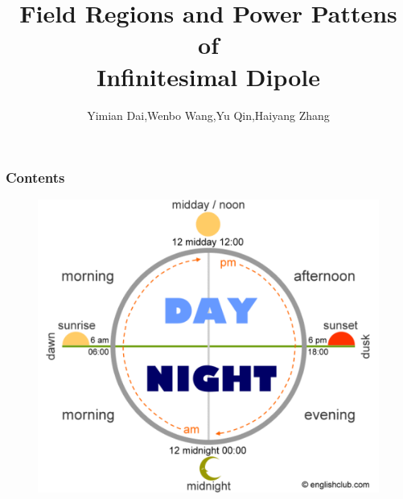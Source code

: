 \documentclass[compress=true]{beamer}
\title{Field Regions and Power Pattens of \\ Infinitesimal Dipole}
\author{\tiny{Yimian Dai,Wenbo Wang,Yu Qin,Haiyang Zhang}}
\institute{\url{http://dspandlinux.com}}
\begin{document}
\begin{frame}
\titlepage
\end{frame}
\begin{frame}
  \frametitle{Contents}
  \begin{figure}
    \includegraphics[height=0.8\textheight]{day-night.png}
  \end{figure}
\end{frame}
\end{document}
